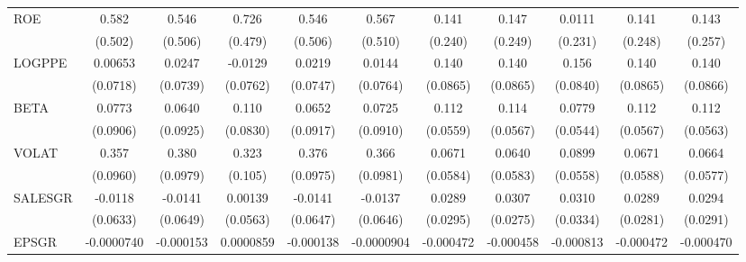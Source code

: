 \begin{table}[htbp]
\begin{tabular}{l*{10}{c}}
ROE             &    0.582         &    0.546         &    0.726         &    0.546         &    0.567         &    0.141         &    0.147         &   0.0111         &    0.141         &    0.143         \\
                &  (0.502)         &  (0.506)         &  (0.479)         &  (0.506)         &  (0.510)         &  (0.240)         &  (0.249)         &  (0.231)         &  (0.248)         &  (0.257)         \\
LOGPPE          &  0.00653         &   0.0247         &  -0.0129         &   0.0219         &   0.0144         &    0.140         &    0.140         &    0.156\sym{*}  &    0.140         &    0.140         \\
                & (0.0718)         & (0.0739)         & (0.0762)         & (0.0747)         & (0.0764)         & (0.0865)         & (0.0865)         & (0.0840)         & (0.0865)         & (0.0866)         \\
BETA            &   0.0773         &   0.0640         &    0.110         &   0.0652         &   0.0725         &    0.112\sym{*}  &    0.114\sym{**} &   0.0779         &    0.112\sym{*}  &    0.112\sym{*}  \\
                & (0.0906)         & (0.0925)         & (0.0830)         & (0.0917)         & (0.0910)         & (0.0559)         & (0.0567)         & (0.0544)         & (0.0567)         & (0.0563)         \\
VOLAT           &    0.357\sym{***}&    0.380\sym{***}&    0.323\sym{***}&    0.376\sym{***}&    0.366\sym{***}&   0.0671         &   0.0640         &   0.0899         &   0.0671         &   0.0664         \\
                & (0.0960)         & (0.0979)         &  (0.105)         & (0.0975)         & (0.0981)         & (0.0584)         & (0.0583)         & (0.0558)         & (0.0588)         & (0.0577)         \\
SALESGR         &  -0.0118         &  -0.0141         &  0.00139         &  -0.0141         &  -0.0137         &   0.0289         &   0.0307         &   0.0310         &   0.0289         &   0.0294         \\
                & (0.0633)         & (0.0649)         & (0.0563)         & (0.0647)         & (0.0646)         & (0.0295)         & (0.0275)         & (0.0334)         & (0.0281)         & (0.0291)         \\
EPSGR           &-0.0000740         &-0.000153         &0.0000859         &-0.000138         &-0.0000904         &-0.000472         &-0.000458         &-0.000813\sym{**} &-0.000472         &-0.000470         \\

\end{tabular}
\end{table}
